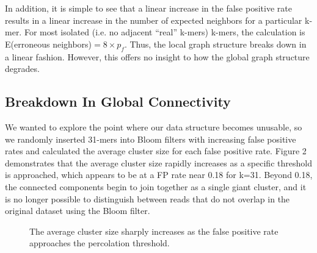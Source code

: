 \documentclass[12pt]{article} \usepackage{simplemargins}
\begin{document}
In addition, it is simple to see that a linear increase in the false 
positive rate results in a linear increase in the number of expected 
neighbors for a particular k-mer. For most isolated (i.e. no adjacent 
``real'' k-mers) k-mers, the calculation is 
E(erroneous neighbors)$ = 8 \times p_f$. Thus, the local graph 
structure breaks down in a linear fashion. However, this offers no insight 
to how the global graph structure degrades.

\subsection{Breakdown In Global Connectivity}
We wanted to explore the point where our data structure becomes unusable, 
so we randomly inserted 31-mers into Bloom
filters with increasing false positive rates and calculated the average
cluster size for each false positive rate. Figure 2 demonstrates that 
the average cluster
size rapidly increases as a specific threshold is approached,
which appears to be at a FP rate near 0.18 for k=31. Beyond 0.18, 
the connected components begin to join together as a single giant 
cluster, and it is no longer possible to distinguish between reads 
that do not overlap in the original dataset using the Bloom filter.

\begin{figure}
\caption{The average cluster size sharply increases as the false positive 
rate approaches the percolation threshold.
}
\end{figure}
\end{document}
